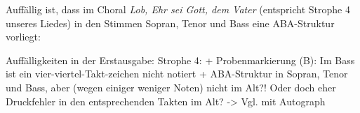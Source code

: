 Auffällig ist, dass im Choral \emph{Lob, Ehr sei Gott, dem Vater} (entspricht Strophe 4 unseres Liedes) in den Stimmen Sopran, Tenor und Bass eine ABA-Struktur vorliegt: 

Auffälligkeiten in der Erstausgabe:
Strophe 4: 
+ Probenmarkierung (B): Im Bass ist ein vier-viertel-Takt-zeichen nicht notiert
+ ABA-Struktur in Sopran, Tenor und Bass, aber (wegen einiger weniger Noten) nicht im Alt?! Oder doch eher Druckfehler in den entsprechenden Takten im Alt? -> Vgl. mit Autograph
